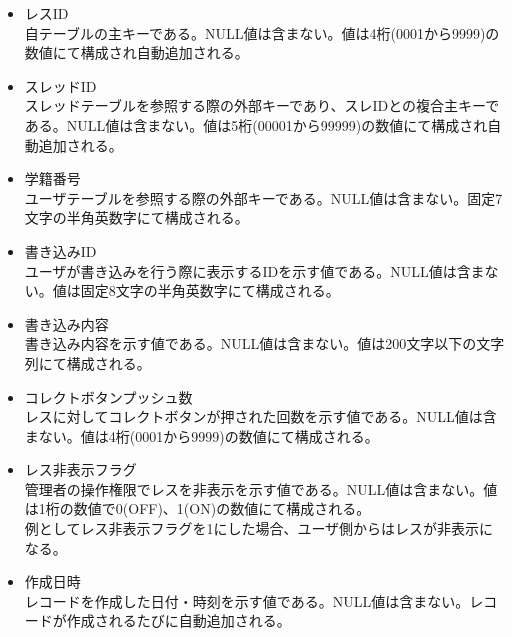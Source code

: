 \documentclass[a4j]{jarticle}
\begin{document}
  \begin{itemize}
  \item レスID\\
    自テーブルの主キーである。NULL値は含まない。値は4桁(0001から9999)の数値にて構成され自動追加される。
  \item スレッドID\\
    スレッドテーブルを参照する際の外部キーであり、スレIDとの複合主キーである。NULL値は含まない。値は5桁(00001から99999)の数値にて構成され自動追加される。
  \item 学籍番号\\
    ユーザテーブルを参照する際の外部キーである。NULL値は含まない。固定7文字の半角英数字にて構成される。\\
  \item 書き込みID\\
    ユーザが書き込みを行う際に表示するIDを示す値である。NULL値は含まない。値は固定8文字の半角英数字にて構成される。\\
  \item 書き込み内容\\
    書き込み内容を示す値である。NULL値は含まない。値は200文字以下の文字列にて構成される。\\
  \item コレクトボタンプッシュ数\\
    レスに対してコレクトボタンが押された回数を示す値である。NULL値は含まない。値は4桁(0001から9999)の数値にて構成される。\\
  \item レス非表示フラグ\\
    管理者の操作権限でレスを非表示を示す値である。NULL値は含まない。値は1桁の数値で0(OFF)、1(ON)の数値にて構成される。\\
    例としてレス非表示フラグを1にした場合、ユーザ側からはレスが非表示になる。

  \item 作成日時\\
    レコードを作成した日付・時刻を示す値である。NULL値は含まない。レコードが作成されるたびに自動追加される。
  \end{itemize}
\end{document}
